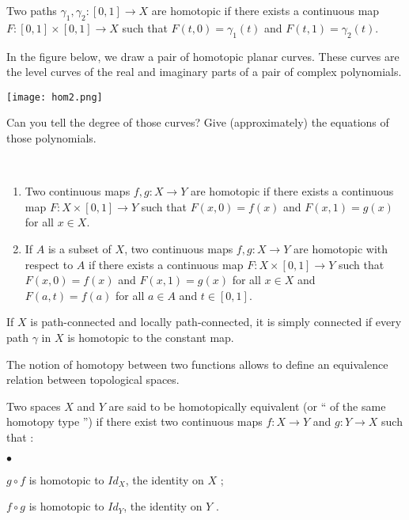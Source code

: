 \begin{definition}
Two paths $\gamma_{1}, \gamma_{2}:[0,1]\to X$ are homotopic if there exists a continuous map $F:[0,1]\times [0,1] \to X$ such that $F(t,0)=\gamma_{1}(t)$ and
$F(t,1)=\gamma_{2}(t)$. \end{definition}
\begin{example}
In the figure below, we draw a pair of homotopic planar curves. These curves are the level curves of the real and imaginary parts of a pair of complex polynomials.   
\begin{center}
\texttt{[image: hom2.png]}
\end{center}
Can you tell the degree of those curves?  Give (approximately) the equations of those polynomials.
\end{example}
\begin{definition}

\

\begin{enumerate}
\item Two continuous maps $f,g:X\to Y$ are homotopic if there exists a continuous map $F:X\times [0,1] \to Y$ such that $F(x,0)=f(x)$ and
$F(x,1)=g(x)$ for all $x\in X$.

\item If $A$ is a subset of $X$, two continuous maps $f,g:X\to Y$ are homotopic with respect to $A$ if there exists a continuous map $F:X\times [0,1] \to Y$ such that $F(x,0)=f(x)$ and
$F(x,1)=g(x)$ for all $x\in X$ and $F(a,t)=f(a)$ for all $a\in A$ and $t\in [0,1]$.
\end{enumerate}
\end{definition}

\begin{theorem}
If $X$ is path-connected and locally path-connected, it is simply connected if every path $\gamma$ in $X$ is homotopic to the constant map.
\end{theorem} 

The notion of homotopy between two functions allows to define an equivalence relation between topological spaces.

\begin{definition}
Two spaces $X$ and $Y$ are said to be homotopically equivalent (or `` of the same homotopy type '') if there exist two continuous maps $f:X\to Y$ and $g:Y\to X$ such that :
\begin{list}{$\bullet$}{}
\item $g\circ f $ is homotopic to $Id_{X}$, the identity on $X$ ;
\item $f\circ g $ is homotopic to $Id_{Y}$, the identity on $Y$ .
\end{list}
\end{definition}

